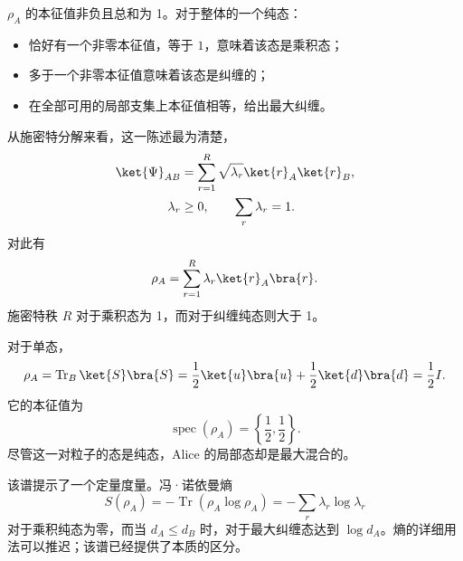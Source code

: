 \(\rho_A\) 的本征值非负且总和为 1。对于整体的一个纯态：
\begin{itemize}
\item 恰好有一个非零本征值，等于 \(1\)，意味着该态是乘积态；
\item 多于一个非零本征值意味着该态是纠缠的；
\item 在全部可用的局部支集上本征值相等，给出最大纠缠。
\end{itemize}
从施密特分解来看，这一陈述最为清楚，
\begin{equation}
\begin{aligned}
\ket{\Psi}_{AB}
&=\sum_{r=1}^{R}\sqrt{\lambda_r}
\ket{r}_A\ket{r}_B,\\
\lambda_r&\geq0,
\qquad
\sum_r\lambda_r=1.
\end{aligned}
\label{eq:l7-schmidt}
\end{equation}
对此有
\begin{equation}
\rho_A=\sum_{r=1}^{R}\lambda_r\ket{r}_A\bra{r}.
\label{eq:l7-schmidt-density}
\end{equation}
施密特秩 \(R\) 对于乘积态为 1，而对于纠缠纯态则大于 1。

对于单态，
\begin{equation}
\rho_A
=\operatorname{Tr}_B\ket{S}\bra{S}
=\frac12\ket{u}\bra{u}
+\frac12\ket{d}\bra{d}
=\frac12 I.
\label{eq:l7-singlet-reduced-density}
\end{equation}
它的本征值为
\begin{equation}
\operatorname{spec}(\rho_A)
=\left\{\frac12,\frac12\right\}.
\end{equation}
尽管这一对粒子的态是纯态，Alice 的局部态却是最大混合的。

该谱提示了一个定量度量。冯·诺依曼熵
\begin{equation}
S(\rho_A)
=-\operatorname{Tr}(\rho_A\log\rho_A)
=-\sum_r\lambda_r\log\lambda_r
\label{eq:l7-entanglement-entropy}
\end{equation}
对于乘积纯态为零，而当 \(d_A\leq d_B\) 时，对于最大纠缠态达到 \(\log d_A\)。熵的详细用法可以推迟；该谱已经提供了本质的区分。

\begin{classroomqa}
\end{classroomqa}

